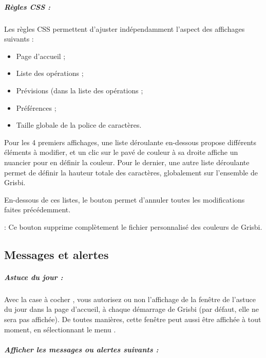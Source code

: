 \subparagraph{Règles CSS :\label{setup-display-logo-CSS}}

Les règles CSS permettent d'ajuster indépendamment l'aspect des affichages suivants :

\begin{itemize}
	\item Page d'accueil ;
	\item Liste des opérations ;
	\item Prévisions (dans la liste des opérations ;	
	\item Préférences ;
	\item Taille globale de la police de caractères.
\end{itemize}


Pour les 4 premiers affichages, une liste déroulante en-dessous propose différents éléments à modifier, et un clic sur le pavé de couleur à sa droite affiche un nuancier pour en définir la couleur. Pour le dernier, une autre liste déroulante permet de définir la hauteur totale des caractères, globalement sur l'ensemble de Grisbi.


En-dessous de ces listes, le bouton  permet d'annuler toutes les modifications faites précédemment. 

 : Ce bouton supprime complètement le fichier personnalisé des couleurs de Grisbi.



\subsection{Messages et alertes\label{setup-display-messages}}



\subparagraph{Astuce du jour :\label{setup-display-messages-trick}}

Avec la case à cocher , vous autorisez ou non  l'affichage de la fenêtre de l'astuce du jour dans la page d'accueil, à chaque démarrage de Grisbi (par défaut, elle ne sera pas affichée). De toutes manières, cette fenêtre peut aussi être affichée à tout moment, en sélectionnant le menu .


\subparagraph{Afficher les messages ou alertes suivants :\label{setup-display-messages-alerts}}

